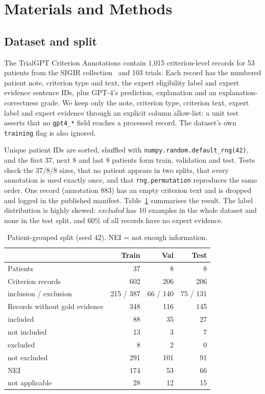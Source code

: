 \documentclass[conference]{IEEEtran}
\begin{document}
\section{Materials and Methods}

\subsection{Dataset and split}
The TrialGPT Criterion Annotations contain 1{,}015 criterion-level records for 53 patients from the SIGIR collection~\cite{koopman2016test} and 103 trials. Each record has the numbered patient note, criterion type and text, the expert eligibility label and expert evidence sentence IDs, plus GPT-4's prediction, explanation and an explanation-correctness grade. We keep only the note, criterion type, criterion text, expert label and expert evidence through an explicit column allow-list; a unit test asserts that no \texttt{gpt4\_*} field reaches a processed record. The dataset's own \texttt{training} flag is also ignored.

Unique patient IDs are sorted, shuffled with \texttt{numpy.random.default\_rng(42)}, and the first 37, next 8 and last 8 patients form train, validation and test. Tests check the 37/8/8 sizes, that no patient appears in two splits, that every annotation is used exactly once, and that \texttt{rng.permutation} reproduces the same order. One record (annotation 883) has an empty criterion text and is dropped and logged in the published manifest. Table~\ref{tab:data} summarises the result. The label distribution is highly skewed: \emph{excluded} has 10 examples in the whole dataset and none in the test split, and 60\% of all records have no expert evidence.

\begin{table}[t]
\centering
\caption{Patient-grouped split (seed 42). NEI = not enough information.}
\label{tab:data}
\begin{tabular}{lrrr}
\toprule
 & Train & Val & Test \\
\midrule
Patients & 37 & 8 & 8 \\
Criterion records & 602 & 206 & 206 \\
\quad inclusion / exclusion & 215 / 387 & 66 / 140 & 75 / 131 \\
Records without gold evidence & 348 & 116 & 145 \\
\midrule
included & 88 & 35 & 27 \\
not included & 13 & 3 & 7 \\
excluded & 8 & 2 & 0 \\
not excluded & 291 & 101 & 91 \\
NEI & 174 & 53 & 66 \\
not applicable & 28 & 12 & 15 \\
\bottomrule
\end{tabular}
\end{table}
\end{document}

